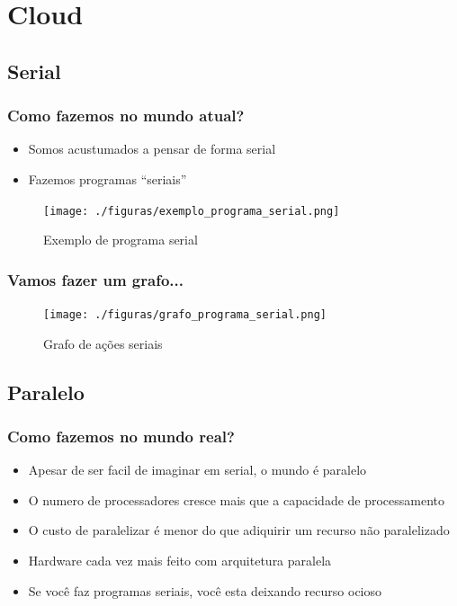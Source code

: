 \documentclass[10pt]{beamer}
\begin{document}
\section{Cloud}
	\subsection{Serial}
		\begin{frame}%
		\frametitle{Como fazemos no mundo atual?}
			\begin{itemize}
				\item Somos acustumados a pensar de forma serial
				\item Fazemos programas ``seriais''
			\end{itemize}
			\begin{figure}
			\centering
				\texttt{[image: ./figuras/exemplo\_programa\_serial.png]}
				\caption{Exemplo de programa serial}
			\end{figure}
		\end{frame}

		\begin{frame}%
		\frametitle{Vamos fazer um grafo...}
			\begin{figure}
			\centering
				\texttt{[image: ./figuras/grafo\_programa\_serial.png]}
				\caption{Grafo de ações seriais}
			\end{figure}
		\end{frame}

	\subsection{Paralelo}
		\begin{frame}%
		\frametitle{Como fazemos no mundo real?}
			\begin{itemize}[<-+>]
				\item Apesar de ser facil de imaginar em serial, o mundo é paralelo
				\item O numero de processadores cresce mais que a capacidade de processamento
				\item O custo de paralelizar é menor do que adiquirir um recurso não paralelizado
				\item Hardware cada vez mais feito com arquitetura paralela
				\item Se você faz programas seriais, você esta deixando recurso ocioso
			\end{itemize}
		\end{frame}
\end{document}
